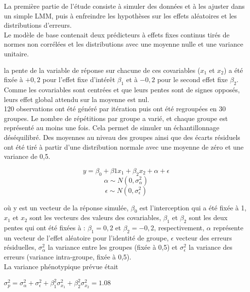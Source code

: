 \documentclass{article}
\begin{document}
La première partie de l’étude consiste à simuler des données et à les ajuster dans un simple LMM, puis à enfreindre les hypothèses sur les effets aléatoires et les distributions d'erreurs. \\
Le modèle de base contenait deux prédicteurs à effets fixes continus tirés de normes non corrélées et les distributions avec une moyenne nulle et une variance unitaire. 

la pente de la variable de réponse sur chacune de ces covariables ($x_1$ et $x_2$) a été fixée à $+0,2$ pour l'effet fixe d'intérêt $\beta_1$  et à $-0,2$ pour le second effet fixe $\beta_2$. \\

 Comme les covariables sont centrées et que leurs pentes sont de signes opposés, leurs effet global attendu sur la moyenne est nul. \\

120 observations ont été généré par itération puis ont été regroupées en 30 groupes. Le nombre de répétitions par groupe a varié, et chaque groupe est représenté au moins une fois. Cela permet de simuler un échantillonnage déséquilibré. Des moyennes au niveau des groupes ainsi que des écarts résiduels ont été tiré à partir d'une distribution normale avec une moyenne de zéro et une variance de 0,5. 



$$ y=\beta_0+\beta1x_1+\beta_2x_2+\alpha+\epsilon  $$
$$ \alpha \sim  N(0,\sigma^2_{\alpha}) $$
$$ \epsilon \sim  N(0,\sigma^2_{\epsilon}) $$

où y est un vecteur de la réponse simulée, $\beta_0$ est l'interception qui a été fixée à 1, $x_1$ et $x_2$ sont les vecteurs des valeurs des covariables, $\beta_1$ et $\beta_2$ sont les deux pentes qui ont été fixées à :  $\beta_1 = 0,2$ et $\beta_2 = -0,2$, respectivement,
$\alpha$ représente un vecteur de l'effet aléatoire pour l'identité de groupe, $\epsilon$ vecteur
des erreurs résiduelles, $\sigma^2_{\alpha}$ la variance entre les groupes (fixée à 0,5)
et $\sigma^2_{\epsilon}$ la variance des erreurs (variance intra-groupe, fixée à 0,5).  \\
La variance phénotypique prévue était 
\begin{center}

$\sigma^2_{p}=\sigma^2_{\alpha}+\sigma^2_{\epsilon}+\beta^2_{1} \sigma^2_{x_1} +  \beta^2_{2} \sigma^2_{x_2}=1.08$ \\

\end{center}
\end{document}
